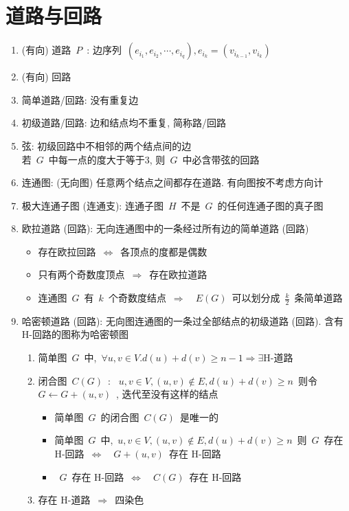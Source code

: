 \documentclass[11pt,a4paper]{article}%
\renewcommand{\[}{~$}
\renewcommand{\]}{$~}%
\begin{document}
\section{道路与回路}
	\begin{enumerate}
	 \item (有向) 道路\[P\]: 边序列\[(e_{i_1}, e_{i_2},\cdots,e_{i_q}),e_{i_k} = (v_{i_{k-1}},v_{i_k})\]
	 \item (有向) 回路
	 \item 简单道路/回路: 没有重复边
	 \item 初级道路/回路: 边和结点均不重复, 简称路/回路
	 \item 弦: 初级回路中不相邻的两个结点间的边\\
	 	若\[G\]中每一点的度大于等于3, 则\[G\]中必含带弦的回路
	 \item 连通图: (无向图) 任意两个结点之间都存在道路. 有向图按不考虑方向计
	 \item 极大连通子图 (连通支): 连通子图\[H\]不是\[G\]的任何连通子图的真子图 
	 \item 欧拉道路 (回路): 无向连通图中的一条经过所有边的简单道路 (回路)
	 	\begin{itemize}
	 	 \item 存在欧拉回路\[\Leftrightarrow\]各顶点的度都是偶数
	 	 \item 只有两个奇数度顶点\[\Rightarrow\]存在欧拉道路
	 	 \item 连通图\[G\]有\[k\]个奇数度结点\[\Rightarrow\]\[E(G)\]可以划分成\[\frac k2\]条简单道路
	 	\end{itemize}
	 \item 哈密顿道路 (回路): 无向图连通图的一条过全部结点的初级道路 (回路). 含有 H-回路的图称为哈密顿图
	 	\begin{enumerate}
	 	 \item 简单图\[G\]中,\[\forall u,v\in V. d(u) + d(v)\ge n-1 \Rightarrow \exists \mbox{H-道路}\]
	 	 \item 闭合图\[C(G)\]: \[u,v\in V, (u,v)\notin E, d(u)+d(v)\ge n\]则令\[G\leftarrow G+(u,v)\], 迭代至没有这样的结点
	 	 	\begin{itemize}
	 	 	 \item 简单图\[G\]的闭合图\[C(G)\]是唯一的
	 	 	 \item 简单图\[G\]中,\[u,v\in V, (u,v)\notin E, d(u)+d(v)\ge n\]则\[G\]存在 H-回路\[\Leftrightarrow\]\[G+(u,v)\]存在 H-回路
	 	 	 \item \[G\]存在 H-回路\[\Leftrightarrow\]\[C(G)\]存在 H-回路
	 	 	\end{itemize}
	 	 \item 存在 H-道路\[\Rightarrow\]四染色

\end{enumerate}
\end{enumerate}
\end{document}

